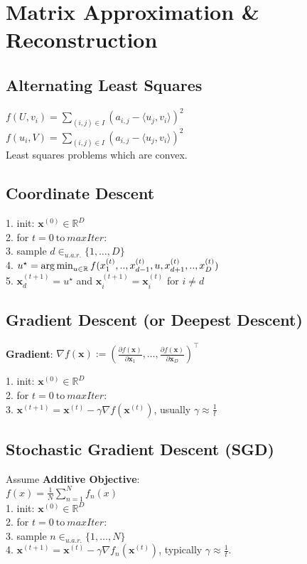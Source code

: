 \section{Matrix Approximation \& Reconstruction}

\subsection*{Alternating Least Squares}
$f(U,v_i) = \sum_{(i,j)\in I} (a_{i,j} - \langle u_j, v_i \rangle)^2$\\
$f(u_i,V) = \sum_{(i,j)\in I} (a_{i,j} - \langle u_j, v_i \rangle)^2$\\
Least squares problems which are convex.

\subsection*{Coordinate Descent}
1. init: $\mathbf{x}^{(0)} \in \mathbb{R}^D$\\
2. for $t = 0 \ \text{to} \ \mathit{maxIter}$:\\
3. sample $d \in_{u.a.r.} \{1, \ldots, D\}$\\
4. $u^\star = \operatorname*{arg\,min}_{u \in \mathbb{R}} f(x_1^{(t)}, .., x_{d-1}^{(t)}, u, x_{d+1}^{(t)}, .., x_D^{(t)})$\\
5. $\mathbf{x}_d^{(t+1)} = u^\star$ and $\mathbf{x}_i^{(t+1)} = \mathbf{x}_i^{(t)}$ for $i \neq d$

\subsection*{Gradient Descent (or Deepest Descent)}
\textbf{Gradient}: $\nabla f(\mathbf{x}) := \left( \frac{\partial f(\mathbf{x})}{\partial \mathbf{x}_1}, \ldots, \frac{\partial f(\mathbf{x})}{\partial \mathbf{x}_D} \right)^\top$

1. init: $\mathbf{x}^{(0)} \in \mathbb{R}^D$\\
2. for $t = 0 \ \text{to} \ \mathit{maxIter}$:\\
3. $\mathbf{x}^{(t+1)} = \mathbf{x}^{(t)} - \gamma \nabla f(\mathbf{x}^{(t)})$, usually $\gamma \approx \frac{1}{t}$

\subsection*{Stochastic Gradient Descent (SGD)}
Assume \textbf{Additive Objective}:\\
$f(x) = \frac{1}{N}\sum_{n=1}^{N}f_n(x)$\\
1. init: $\mathbf{x}^{(0)} \in \mathbb{R}^D$\\
2. for $t = 0 \ \text{to} \ \mathit{maxIter}$:\\
3. sample $n \in_{u.a.r.} \{1, \ldots, N\}$\\
4. $\mathbf{x}^{(t+1)} = \mathbf{x}^{(t)} - \gamma \nabla f_n(\mathbf{x}^{(t)})$, typically  $\gamma \approx \frac{1}{t}$.

